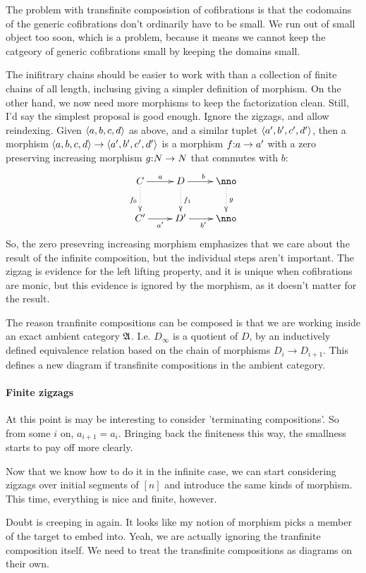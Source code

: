 \documentclass[csh.tex]{subfiles}
\begin{document}
The problem with transfinite composistion of cofibrations is that the codomains of the generic cofibrations don't ordinarily have to be small. We run out of small object too soon, which is a problem, because it means we cannot keep the catgeory of generic cofibrations small by keeping the domains small.

The inifitrary chains should be easier to work with than a collection of finite chains of all length, inclusing giving a simpler definition of morphism. On the other hand, we now need more morphisms to keep the factorization clean. Still, I'd say the simplest proposal is good enough. Ignore the zigzags, and allow reindexing. Given $\left\langle a,b,c,d \right\rangle$ as above, and a similar tuplet $\left\langle a',b',c',d' \right\rangle$, then a morphism $\left\langle a,b,c,d \right\rangle\to\left\langle a',b',c',d' \right\rangle$ is a morphism $f\mathord : a \to a'$ with a zero preserving increasing morphism $g\mathord : N\to N$ that commutes with $b$:
\[
\xymatrix{
C\ar[r]^a\ar@{.>}[d]_{f_0} & D \ar[r]^b\ar@{.>}[d]^{f_1} & \nno\ar@{.>}[d]^g\\
C'\ar[r]_{a'} & D'\ar[r]_{b'} & \nno 
}\]
So, the zero presevring increasing morphism emphasizes that we care about the result of the infinite composition, but the individual steps aren't important. The zigzag is evidence for the left lifting property, and it is unique when cofibrations are monic, but this evidence is ignored by the morphism, as it doesn't matter for the result.

The reason tranfinite compositions can be composed is that we are working inside an exact ambient category $\mathfrak A$. I.e. $D_\infty$ is a quotient of $D$, by an inductively defined equivalence relation based on the chain of morphisms $D_i\to D_{i+1}$. This defines a new diagram if transfinite compositions in the ambient category.

\paragraph{Finite zigzags}
At this point is may be interesting to consider 'terminating compositions'. So from some $i$ on, $a_{i+1} = a_i$. Bringing back the finiteness this way, the smallness starts to pay off more clearly. 

Now that we know how to do it in the infinite case, we can start considering zigzags over initial segments of $[n]$ and introduce the same kinds of morphism. This time, everything is nice and finite, however.

Doubt is creeping in again. 
It looks like my notion of morphism picks a member of the target to embed into. 
Yeah, we are actually ignoring the tranfinite composition itself. We need to treat the transfinite compositions as diagrams on their own.
\end{document}
